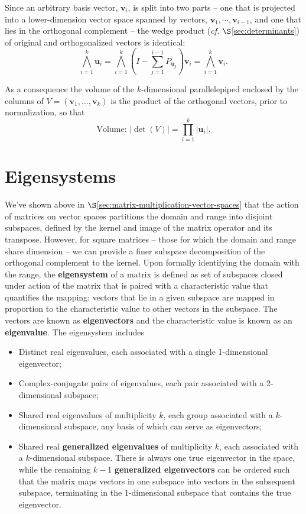 \documentclass[12pt, twoside, draft]{article}
\begin{document}
Since an arbitrary basis vector, $\mathbf{v}_i$, is split into two parts -- one that is projected into a lower-dimension vector space spanned by vectors, $\mathbf{v}_1, \cdots, \mathbf{v}_{i-1}$, and one that lies in the orthogonal complement -- the wedge product  (\textit{cf.} $\S$\ref{sec:determinants}) of original and orthogonalized vectors is identical:
\begin{equation}
\bigwedge_{i=1}^k \mathbf{u}_i = \bigwedge_{i=1}^k \left( I - \sum_{j=1}^{i-1} P_{\mathbf{u}_j} \right) \mathbf{v}_i = \bigwedge_{i=1}^k \mathbf{v}_i.
\end{equation}

As a consequence the volume of the $k$-dimensional parallelepiped enclosed by the columns of $V = (\mathbf{v}_1, \ldots, \mathbf{v}_k)$ is the product of the orthogonal vectors, prior to normalization, so that
\begin{equation}\label{eq:GS_volume}
\text{Volume: } | \operatorname{det} (V) | = \prod_{i=1}^k | \mathbf{u}_i |.
\end{equation}

\section{Eigensystems}\label{sec:eigensystems}
We've shown above in $\S$\ref{sec:matrix-multiplication-vector-spaces} that the action of matrices on vector spaces partitions the domain and range into disjoint subspaces, defined by the kernel and image of the matrix operator and its transpose.  However, for square matrices -- those for which the domain and range share dimension -- we can provide a finer subspace decomposition of the orthogonal complement to the kernel.  Upon formally identifying the domain with the range, the \textbf{eigensystem} of a matrix is defined as set of subspaces closed under action of the matrix that is paired with a characteristic value that quantifies the mapping: vectors that lie in a given subspace are mapped in proportion to the characteristic value to other vectors in the subspace.  The vectors are known as \textbf{eigenvectors} and the characteristic value is known as an \textbf{eigenvalue}.  The eigensystem includes
\begin{itemize}[noitemsep]
\item Distinct real eigenvalues, each associated with a single 1-dimensional eigenvector;
\item Complex-conjugate pairs of eigenvalues, each pair associated with a 2-dimensional subspace;
\item Shared real eigenvalues of multiplicity $k$, each group associated with a $k$-dimensional subspace, any basis of which can serve as eigenvectors;
\item Shared real \textbf{generalized eigenvalues} of multiplicity $k$, each associated with a $k$-dimensional subspace.  There is always one true eigenvector in the space, while the remaining $k-1$ \textbf{generalized eigenvectors} can be ordered such that the matrix maps vectors in one subspace into vectors in the subsequent subspace, terminating in the 1-dimensional subspace that contains the true eigenvector.
\end{itemize}
\end{document}
